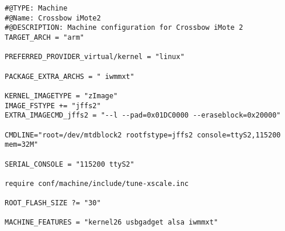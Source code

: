 

\begin{verbatim}
#@TYPE: Machine
#@Name: Crossbow iMote2
#@DESCRIPTION: Machine configuration for Crossbow iMote 2
TARGET_ARCH = "arm"

PREFERRED_PROVIDER_virtual/kernel = "linux"

PACKAGE_EXTRA_ARCHS = " iwmmxt"

KERNEL_IMAGETYPE = "zImage"
IMAGE_FSTYPE += "jffs2"
EXTRA_IMAGECMD_jffs2 = "--l --pad=0x01DC0000 --eraseblock=0x20000"

CMDLINE="root=/dev/mtdblock2 rootfstype=jffs2 console=ttyS2,115200 mem=32M"

SERIAL_CONSOLE = "115200 ttyS2"

require conf/machine/include/tune-xscale.inc

ROOT_FLASH_SIZE ?= "30"

MACHINE_FEATURES = "kernel26 usbgadget alsa iwmmxt"
\end{verbatim}
